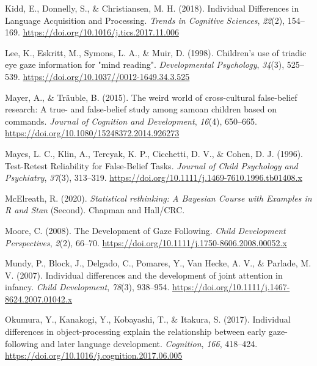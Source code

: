\documentclass[
  man,floatsintext]{apa6}
\newlength{\cslhangindent}
\newlength{\cslentryspacingunit} %
\newenvironment{CSLReferences}[2] %
 {%
  \setlength{\parindent}{0pt}
  \ifodd #1
  \let\oldpar\par
  \def\par{\hangindent=\cslhangindent\oldpar}
  \fi
  \setlength{\parskip}{#2\cslentryspacingunit}
 }%
 {}
\begin{document}
\begin{CSLReferences}{1}{0}
\leavevmode{}%
Kidd, E., Donnelly, S., \& Christiansen, M. H. (2018). Individual {Differences} in {Language Acquisition} and {Processing}. \emph{Trends in Cognitive Sciences}, \emph{22}(2), 154--169. \url{https://doi.org/10.1016/j.tics.2017.11.006}

\leavevmode{}%
Lee, K., Eskritt, M., Symons, L. A., \& Muir, D. (1998). Children's use of triadic eye gaze information for "mind reading". \emph{Developmental Psychology}, \emph{34}(3), 525--539. \url{https://doi.org/10.1037//0012-1649.34.3.525}

\leavevmode{}%
Mayer, A., \& Träuble, B. (2015). The weird world of cross-cultural false-belief research: {A} true- and false-belief study among samoan children based on commands. \emph{Journal of Cognition and Development}, \emph{16}(4), 650--665. \url{https://doi.org/10.1080/15248372.2014.926273}

\leavevmode{}%
Mayes, L. C., Klin, A., Tercyak, K. P., Cicchetti, D. V., \& Cohen, D. J. (1996). Test-{Retest Reliability} for {False-Belief Tasks}. \emph{Journal of Child Psychology and Psychiatry}, \emph{37}(3), 313--319. \url{https://doi.org/10.1111/j.1469-7610.1996.tb01408.x}

\leavevmode{}%
McElreath, R. (2020). \emph{Statistical rethinking: {A Bayesian Course} with {Examples} in {R} and {Stan}} (Second). {Chapman and Hall/CRC}.

\leavevmode{}%
Moore, C. (2008). The {Development} of {Gaze Following}. \emph{Child Development Perspectives}, \emph{2}(2), 66--70. \url{https://doi.org/10.1111/j.1750-8606.2008.00052.x}

\leavevmode{}%
Mundy, P., Block, J., Delgado, C., Pomares, Y., Van Hecke, A. V., \& Parlade, M. V. (2007). Individual differences and the development of joint attention in infancy. \emph{Child Development}, \emph{78}(3), 938--954. \url{https://doi.org/10.1111/j.1467-8624.2007.01042.x}

\leavevmode{}%
Okumura, Y., Kanakogi, Y., Kobayashi, T., \& Itakura, S. (2017). Individual differences in object-processing explain the relationship between early gaze-following and later language development. \emph{Cognition}, \emph{166}, 418--424. \url{https://doi.org/10.1016/j.cognition.2017.06.005}


\end{CSLReferences}
\end{document}
